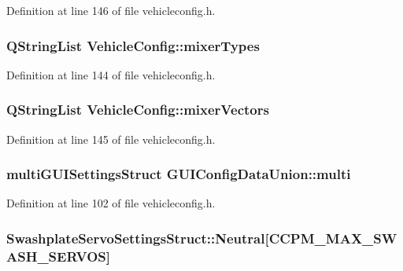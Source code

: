 Definition at line 146 of file vehicleconfig.\-h.

\hypertarget{group___config_plugin_ga494123875db35fe04e5a0512850e8c02}{
\subsubsection[{mixer\-Types}]{\setlength{\rightskip}{0pt plus 5cm}Q\-String\-List Vehicle\-Config\-::mixer\-Types}}\label{group___config_plugin_ga494123875db35fe04e5a0512850e8c02}


Definition at line 144 of file vehicleconfig.\-h.

\hypertarget{group___config_plugin_ga0f47a1cc91e5a63c70f0802f3533e193}{
\subsubsection[{mixer\-Vectors}]{\setlength{\rightskip}{0pt plus 5cm}Q\-String\-List Vehicle\-Config\-::mixer\-Vectors}}\label{group___config_plugin_ga0f47a1cc91e5a63c70f0802f3533e193}


Definition at line 145 of file vehicleconfig.\-h.

\hypertarget{group___config_plugin_ga2bab1814b15f618e30827215faea4f5e}{
\subsubsection[{multi}]{\setlength{\rightskip}{0pt plus 5cm}multi\-G\-U\-I\-Settings\-Struct G\-U\-I\-Config\-Data\-Union\-::multi}}\label{group___config_plugin_ga2bab1814b15f618e30827215faea4f5e}


Definition at line 102 of file vehicleconfig.\-h.

\hypertarget{group___config_plugin_gad228ac505087eafb0d00d4aab3b3e76d}{
\subsubsection[{Neutral}]{ Swashplate\-Servo\-Settings\-Struct\-::\-Neutral\mbox{[}C\-C\-P\-M\-\_\-\-M\-A\-X\-\_\-\-S\-W\-A\-S\-H\-\_\-\-S\-E\-R\-V\-O\-S\mbox{]}}}\label{group___config_plugin_gad228ac505087eafb0d00d4aab3b3e76d}


